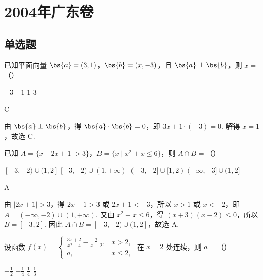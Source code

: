 \chapter{2004年广东卷}
\section{单选题}
\begin{problem}
已知平面向量 \(\bs{a} = (3, 1)\)，\(\bs{b} = (x, -3)\)，且 \(\bs{a} \perp \bs{b}\)，则 \(x =\)（\quad）

\choices
    {\(-3\)}
    {\(-1\)}
    {\(1\)}
    {\(3\)}
\end{problem}

\begin{answer}
C
\end{answer}

\begin{solution}
由 \(\bs{a} \perp \bs{b}\)，得 \(\bs{a}\cdot\bs{b}=0\)，即 \(3x+1\cdot(-3)=0\). 解得 \(x=1\)，故选 C.
\end{solution}

\begin{problem}
已知 \(A = \{x \mid |2x + 1| > 3\}\)，\(B = \{x \mid x^2 + x \leqslant 6\}\)，则 \(A \cap B =\)（\quad）

\choices
    {\([-3, -2) \cup (1, 2]\)}
    {\([-3, -2) \cup (1, +\infty)\)}
    {\((-3, -2] \cup [1, 2)\)}
    {\((-\infty, -3] \cup (1, 2]\)}
\end{problem}

\begin{answer}
A
\end{answer}

\begin{solution}
由 \(|2x+1|>3\)，得 \(2x+1>3\) 或 \(2x+1<-3\)，所以 \(x>1\) 或 \(x<-2\)，即 \(A=(-\infty,-2)\cup(1,+\infty)\). 又由 \(x^2+x\leqslant6\)，得 \((x+3)(x-2)\leqslant0\)，所以 \(B=[-3,2]\). 因此 \(A\cap B=[-3,-2)\cup(1,2]\)，故选 A.
\end{solution}

\begin{problem}
设函数 \( f(x) = \begin{cases}
\frac{3x + 2}{x^2 - 4} - \frac{2}{x - 2}, & x > 2,\\
a, & x \leqslant 2,
\end{cases} \) 在 \( x = 2 \) 处连续，则 \( a =\)（\quad）

\choices
    {\(-\frac{1}{2}\)}
    {\(-\frac{1}{4}\)}
    {\(\frac{1}{4}\)}
    {\(\frac{1}{3}\)}
\end{problem}

